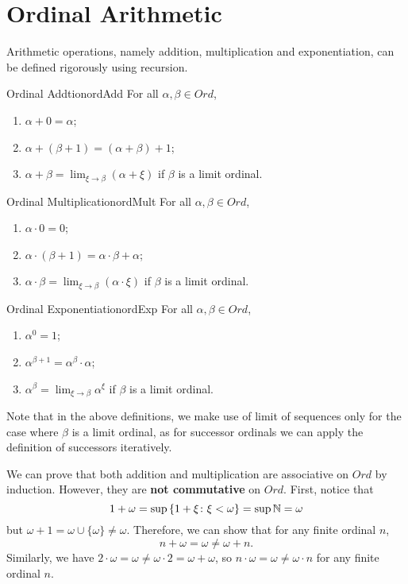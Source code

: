 \documentclass[math]{amznotes}
\theoremstyle{remark}
\begin{document}
\section{Ordinal Arithmetic}
Arithmetic operations, namely addition, multiplication and exponentiation, can be defined rigorously using recursion.
\begin{dfnbox}{Ordinal Addtion}{ordAdd}
    For all $\alpha, \beta \in Ord$,
    \begin{enumerate}
        \item $\alpha + 0 = \alpha$;
        \item $\alpha + (\beta + 1) = (\alpha + \beta) + 1$;
        \item $\alpha + \beta = \lim_{\xi \to \beta}(\alpha + \xi)$ if $\beta$ is a limit ordinal.
    \end{enumerate}
\end{dfnbox}
\begin{dfnbox}{Ordinal Multiplication}{ordMult}
    For all $\alpha, \beta \in Ord$,
    \begin{enumerate}
        \item $\alpha \cdot 0 = 0$;
        \item $\alpha \cdot (\beta + 1) = \alpha \cdot \beta + \alpha$;
        \item $\alpha \cdot \beta = \lim_{\xi \to \beta}(\alpha \cdot \xi)$ if $\beta$ is a limit ordinal.
    \end{enumerate}
\end{dfnbox}
\begin{dfnbox}{Ordinal Exponentiation}{ordExp}
    For all $\alpha, \beta \in Ord$,
    \begin{enumerate}
        \item $\alpha^0 = 1$;
        \item $\alpha^{\beta + 1} = \alpha^\beta \cdot \alpha$;
        \item $\alpha^\beta = \lim_{\xi \to \beta}\alpha^\xi$ if $\beta$ is a limit ordinal.
    \end{enumerate}
\end{dfnbox}
Note that in the above definitions, we make use of limit of sequences only for the case where $\beta$ is a limit ordinal, as for successor ordinals we can apply the definition of successors iteratively.

We can prove that both addition and multiplication are associative on $Ord$ by induction. However, they are \textbf{not commutative} on $Ord$. First, notice that 
\begin{equation*}
    1 + \omega = \sup\,\{1 + \xi \colon \xi < \omega\} = \sup\mathbb{N} = \omega
\end{equation*}
but $\omega + 1 = \omega \cup \{\omega\} \neq \omega$. Therefore, we can show that for any finite ordinal $n$, 
\begin{equation*}
    n + \omega = \omega \neq \omega + n.
\end{equation*}
Similarly, we have $2 \cdot \omega = \omega \neq \omega \cdot 2 = \omega + \omega$, so $n \cdot \omega = \omega \neq \omega \cdot n$ for any finite ordinal $n$.
\end{document}
